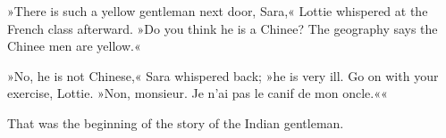 »There is such a yellow gentleman next door, Sara,« Lottie whispered at the French class afterward. »Do you think he is a Chinee? The geography says the Chinee men are yellow.«

»No, he is not Chinese,« Sara whispered back; »he is very ill. Go on with your exercise, Lottie. »\textfrench{Non, monsieur. Je n'ai pas le canif de mon oncle.}««

That was the beginning of the story of the Indian gentleman.